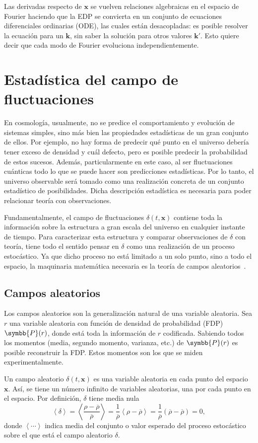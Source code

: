 Las derivadas respecto de \(\symbf{x}\) se vuelven relaciones algebraicas en el espacio de Fourier haciendo que la EDP se convierta en un conjunto de ecuaciones diferenciales ordinarias (ODE), las cuales están desacopladas: es posible resolver la ecuación para un \(\symbf{k}\), sin saber la solución para otros valores \(\symbf{k}'\). Esto quiere decir que cada modo de Fourier evoluciona independientemente.
\section{Estadística del campo de fluctuaciones}
En cosmología, usualmente, no se predice el comportamiento y evolución de sistemas simples, sino más bien las propiedades estadísticas de un gran conjunto de ellos. Por ejemplo, no hay forma de predecir qué punto en el universo debería tener exceso de densidad y cuál defecto, pero es posible predecir la probabilidad de estos sucesos. Además, particularmente en este caso, al ser fluctuaciones cuánticas todo lo que se puede hacer son predicciones estadísticas. Por lo tanto, el universo observable será tomado como una realización concreta de un conjunto estadístico de posibilidades. Dicha descripción estadística es necesaria para poder relacionar teoría con observaciones.

Fundamentalmente, el campo de fluctuaciones \(\delta(t,\symbf{x})\) contiene toda la información sobre la estructura a gran escala del universo en cualquier instante de tiempo. Para caracterizar esta estructura y comparar observaciones de \(\delta\) con teoría, tiene todo el sentido pensar en \(\delta\) como una realización de un proceso estocástico. Ya que dicho proceso no está limitado a un solo punto, sino a todo el espacio, la maquinaria matemática necesaria es la teoría de campos aleatorios~\cite{MILLER1975185}.
\subsection{Campos aleatorios}
Los campos aleatorios son la generalización natural de una variable aleatoria. Sea \(r\) una variable aleatoria con función de densidad de probabilidad (FDP) \(\symbb{P}(r)\), donde está toda la información de \(r\) codificada. Sabiendo todos los momentos (media, segundo momento, varianza, etc.) de \(\symbb{P}(r)\) es posible reconstruir la FDP. Estos momentos son los que se miden experimentalmente.

Un campo aleatorio \(\delta(t,\symbf{x})\) es una variable aleatoria en cada punto del espacio \(\symbf{x}\). Así, se tiene un número infinito de variables aleatorias, una por cada punto en el espacio. Por definición, \(\delta\) tiene media nula
\begin{equation}
    \left\langle\delta\right\rangle=\left\langle\frac{\rho-\overbar{\rho}}{\overbar{\rho}}\right\rangle=\frac{1}{\overbar{\rho}}\left\langle\rho-\overbar{\rho}\right\rangle=\frac{1}{\overbar{\rho}}\left(\overbar{\rho}-\overbar{\rho}\right)=0,\label{eq::media}
\end{equation}
donde \(\left\langle\cdots\right\rangle\) indica media del conjunto o valor esperado del proceso estocástico sobre el que está el campo aleatorio \(\delta\).

